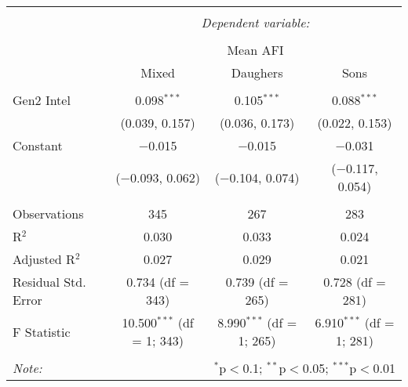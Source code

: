 
\begingroup 
\small 
\begin{tabular}{@{\extracolsep{1pt}}lccc} 
\\[-1.8ex]\hline 
\hline \\[-1.8ex] 
 & \multicolumn{3}{c}{\textit{Dependent variable:}} \\ 
\cline{2-4} 
\\[-1.8ex] & \multicolumn{3}{c}{Mean AFI} \\ 
 & Mixed & Daughers & Sons \\ 
\hline \\[-1.8ex] 
 Gen2 Intel & 0.098$^{***}$ & 0.105$^{***}$ & 0.088$^{***}$ \\ 
  & (0.039, 0.157) & (0.036, 0.173) & (0.022, 0.153) \\ 
  Constant & $-$0.015 & $-$0.015 & $-$0.031 \\ 
  & ($-$0.093, 0.062) & ($-$0.104, 0.074) & ($-$0.117, 0.054) \\ 
 \hline \\[-1.8ex] 
Observations & 345 & 267 & 283 \\ 
R$^{2}$ & 0.030 & 0.033 & 0.024 \\ 
Adjusted R$^{2}$ & 0.027 & 0.029 & 0.021 \\ 
Residual Std. Error & 0.734 (df = 343) & 0.739 (df = 265) & 0.728 (df = 281) \\ 
F Statistic & 10.500$^{***}$ (df = 1; 343) & 8.990$^{***}$ (df = 1; 265) & 6.910$^{***}$ (df = 1; 281) \\ 
\hline 
\hline \\[-1.8ex] 
\textit{Note:}  & \multicolumn{3}{r}{$^{*}$p$<$0.1; $^{**}$p$<$0.05; $^{***}$p$<$0.01} \\ 
\end{tabular} 
\endgroup 
